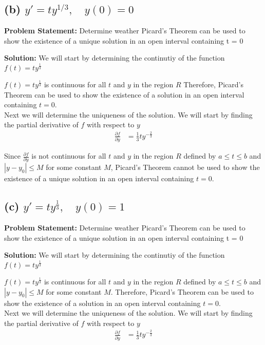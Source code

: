 \documentclass[12pt, letterpaper]{article}
\begin{document}
\subsection*{(b) $y' = ty^{1/3}, \quad y(0) = 0$}
\textbf{Problem Statement:} Determine weather Picard's Theorem can be used to show the existence of a unique solution in an open interval containing t = 0

\textbf{Solution:} We will start by determining the continutiy of the function $f(t) = ty^{\frac{1}{3}}$ 

$f(t) = ty^{\frac{1}{3}}$ is continuous for all $t$ and $y$ in the region $R$ Therefore, Picard's Theorem can be used to show the existence of a  solution in an open interval containing $t = 0$. \\

Next we will determine the uniqueness of the solution. We will start by finding the partial derivative of $f$ with respect to $y$ \\
\begin{align*}
\frac{\partial f}{\partial y} &= \frac{1}{3}ty^{-\frac{2}{3}}
\end{align*}

Since $\frac{\partial f}{\partial y}$ is not continuous for all $t$ and $y$ in the region $R$ defined by $a \leq t \leq b$ and $|y - y_0| \leq M$ for some constant $M$, Picard's Theorem cannot be used to show the existence of a unique solution in an open interval containing $t = 0$.

\subsection*{(c) $y' = ty^{\frac{1}{3}}, \quad y(0) = 1$}
\textbf{Problem Statement:} Determine weather Picard's Theorem can be used to show the existence of a unique solution in an open interval containing t = 0

\textbf{Solution:} We will start by determining the continutiy of the function $f(t) = ty^{\frac{1}{3}}$

$f(t) = ty^{\frac{1}{3}}$ is continuous for all $t$ and $y$ in the region $R$ defined by $a \leq t \leq b$ and $|y - y_0| \leq M$ for some constant $M$. Therefore, Picard's Theorem can be used to show the existence of a  solution in an open interval containing $t = 0$. \\
Next we will determine the uniqueness of the solution. We will start by finding the partial derivative of $f$ with respect to $y$ \\
\begin{align*}
\frac{\partial f}{\partial y} &= \frac{1}{3}ty^{-\frac{2}{3}}
\end{align*}
\end{document}
